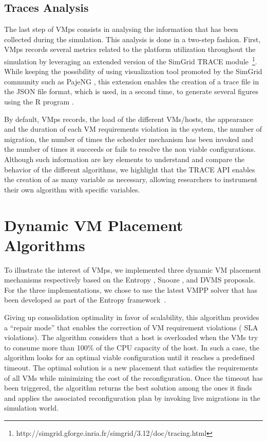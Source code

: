 \documentclass[conference]{IEEEtran}
\newcommand{\sg}{SimGrid\xspace}
\newcommand{\vmps}{VMps\xspace}
\begin{document}
\subsection{Traces Analysis}
\label{subsec:traces-analysis}
The last step of \vmps consists in analysing the
information that has been collected during the simulation.
This analysis is done in a two-step fashion. First, \vmps records
several metrics related to the platform utilization throughout the
simulation by leveraging an extended version of the \sg TRACE
module~\footnote{http://simgrid.gforge.inria.fr/simgrid/3.12/doc/tracing.html}.
While keeping the possibility of using visualization tool
promoted by the \sg community such as PajeNG \cite{pageng:www},
this extension enables the creation of a trace file in the
JSON file format, which is  used, in a second time, to generate several figures
using the R program \cite{R:Bloomfield:2014}.

By default, \vmps records, the load of the different VMs/hosts, the
appearance and the duration of each VM requirements violation in the
system, the number of migration, the number of times the scheduler
mechanism has been invoked and the number of times it succeeds or
fails to resolve the non viable configurations.
%
Although such information are key elements to understand and
compare the behavior of the different algorithms, we highlight that
the TRACE API enables the creation of as many variable as necessary,
allowing researchers to instrument their own algorithm with specific
variables.

\section{Dynamic VM Placement Algorithms}
\label{sec:vm-schedulers}
To illustrate the interest of \vmps, we implemented three dynamic VM
placement mechanisms respectively based on the Entropy
\cite{Hermenier:2009:ECM:1508293.1508300}, Snooze
\cite{feller:ccgrid12}, and DVMS \cite{quesnel:cpe2012} proposals. For the three
implementations, we chose to use the latest VMPP solver that has been
developed as part of the Entropy
framework~\cite{Hermenier:2009:ECM:1508293.1508300, hermenier:cp11}.

%
Giving up consolidation
optimality in favor of scalability, this algorithm provides a ``repair
mode'' that enables the correction of VM requirement violations (\aka
SLA violations). The algorithm considers that a host is
overloaded when the VMs try to consume more than 100\% of the CPU
capacity of the host. In such a case, the algorithm looks for
an optimal viable configuration until it reaches a predefined timeout.
The optimal solution is a new placement that satisfies
the requirements of all VMs while minimizing the cost of the
reconfiguration.
Once the timeout has been triggered, the algorithm returns
the best solution among the ones it finds and applies the associated
reconfiguration plan by invoking live migrations in the simulation
world.
\end{document}
